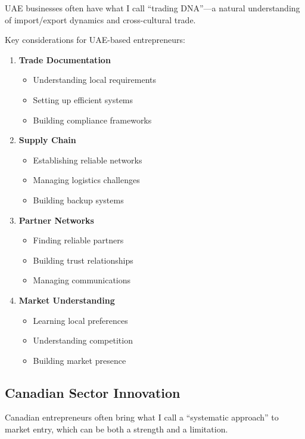 UAE businesses often have what I call ``trading DNA''—a natural understanding of import/export dynamics and cross-cultural trade.

Key considerations for UAE-based entrepreneurs:

\begin{enumerate}
    \item \textbf{Trade Documentation}
    \begin{itemize}
        \item Understanding local requirements
        \item Setting up efficient systems
        \item Building compliance frameworks
    \end{itemize}

    \item \textbf{Supply Chain}
    \begin{itemize}
        \item Establishing reliable networks
        \item Managing logistics challenges
        \item Building backup systems
    \end{itemize}

    \item \textbf{Partner Networks}
    \begin{itemize}
        \item Finding reliable partners
        \item Building trust relationships
        \item Managing communications
    \end{itemize}

    \item \textbf{Market Understanding}
    \begin{itemize}
        \item Learning local preferences
        \item Understanding competition
        \item Building market presence
    \end{itemize}
\end{enumerate}

\subsection{Canadian Sector Innovation}\label{subsec:canadian-sector-innovation-2}

Canadian entrepreneurs often bring what I call a ``systematic approach'' to market entry, which can be both a strength and a limitation.

